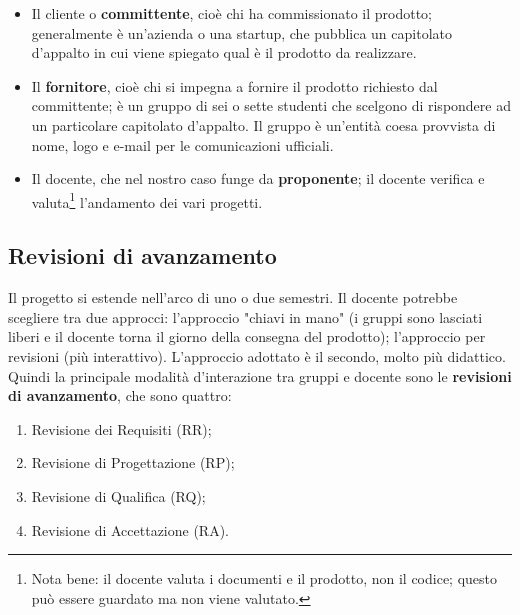 \documentclass[a4paper]{article}
\begin{document}
	\begin{itemize}
		
			
	\item Il cliente o \textbf{committente}, cioè chi ha commissionato il prodotto; generalmente è un'azienda o una startup, che pubblica un capitolato d'appalto in cui viene spiegato qual è il prodotto da realizzare.
			
	\item Il \textbf{fornitore}, cioè chi si impegna a fornire il prodotto richiesto dal committente; è un gruppo di sei o sette studenti che scelgono di rispondere ad un particolare capitolato d'appalto. Il gruppo è un'entità coesa provvista di nome, logo e e-mail per le comunicazioni ufficiali.
			
	\item Il docente, che nel nostro caso funge da \textbf{proponente}; il docente verifica e valuta\footnote{Nota bene: il docente valuta i documenti e il prodotto, non il codice; questo può essere guardato ma non viene valutato.} l'andamento dei vari progetti.
		
	\end{itemize}


		
	\subsection{Revisioni di avanzamento}

		
Il progetto si estende nell'arco di uno o due semestri. Il docente potrebbe scegliere tra due approcci: l'approccio "chiavi in mano" (i gruppi sono lasciati liberi e il docente torna il giorno della consegna del prodotto); l'approccio per revisioni (più interattivo). L'approccio adottato è il secondo, molto più didattico. Quindi la principale modalità d'interazione tra gruppi e docente sono le \textbf{revisioni di avanzamento}, che sono quattro:
		
	\begin{enumerate}
		
			
	\item Revisione dei Requisiti (RR);
			
	\item Revisione di Progettazione (RP);
			
	\item Revisione di Qualifica (RQ);
			
	\item Revisione di Accettazione (RA).
		
	\end{enumerate}
\end{document}
